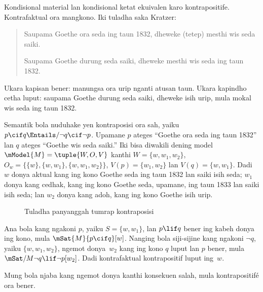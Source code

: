 \documentclass[../../../include/open-logic-section]{subfiles}
\begin{document}


Kondisional material lan kondisional ketat ekuivalen karo
kontrapositife. Kontrafaktual ora mangkono. Iki tuladha saka
Kratzer:
\begin{quote}
  Saupama Goethe ora seda ing taun 1832, dheweke (tetep)
  mesthi wis seda saiki.

  Saupama Goethe durung seda saiki, dheweke mesthi wis seda
  ing taun 1832.
\end{quote}
Ukara kapisan bener: manungsa ora urip nganti atusan taun.
Ukara kapindho cetha luput: saupama Goethe durung seda saiki,
dheweke isih urip, mula mokal wis seda ing taun 1832.

\begin{ex}
  Semantik bola nuduhake yen kontraposisi ora sah, yaiku $p
  \cif q \Entails/ \lnot q \cif \lnot p$. Upamane $p$
  ateges ``Goethe ora seda ing taun 1832'' lan $q$ ateges
  ``Goethe wis seda saiki.'' Iki bisa diwakili dening model
  $\mModel{M} = \tuple{W, O, V}$ kanthi $W = \{w, w_1, w_2\}$,
  $O_w = \{\{w\}, \{w, w_1\}, \{w, w_1, w_2\}\}$,
  $V(p) = \{w_1, w_2\}$ lan $V(q) = \{w, w_1\}$. Dadi $w$
  donya aktual kang ing kono Goethe seda ing taun 1832 lan
  saiki isih seda; $w_1$ donya kang cedhak, kang ing kono
  Goethe seda, upamane, ing taun 1833 lan saiki isih seda;
  lan $w_2$ donya kang adoh, kang ing kono Goethe isih urip.
\begin{figure}
\begin{center}
\caption{Tuladha panyanggah tumrap kontraposisi}
\end{center}
\end{figure}
Ana bola kang ngakoni $p$, yaiku $S = \{w, w_1\}$, lan
$p \lif q$ bener ing kabeh donya ing kono, mula
$\mSat{M}{p \cif q}[w]$. Nanging bola siji-sijine kang
ngakoni $\lnot q$, yaiku $\{w, w_1, w_2\}$, ngemot donya~$w_2$
kang ing kono $q$ luput lan $p$ bener, mula
$\mSat/{M}{\lnot q \lif \lnot p}[w_2]$. Dadi
kontrafaktual kontrapositif luput ing~$w$.
\end{ex}
Mung bola njaba kang ngemot donya kanthi konsekuen salah, mula kontrapositifé ora bener.
\end{document}
